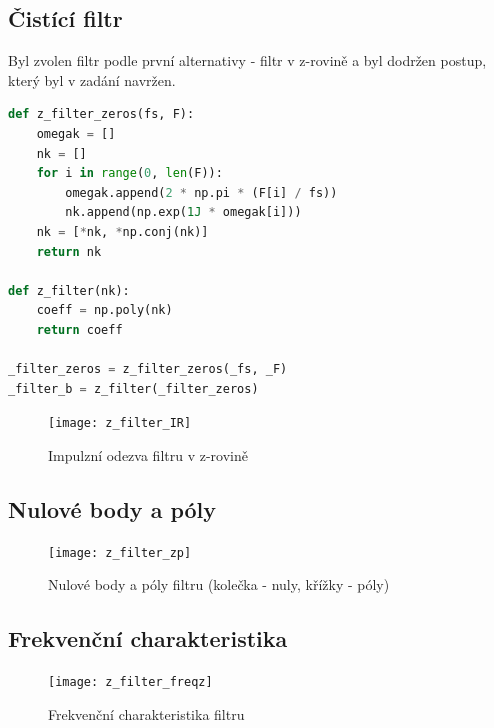 \documentclass{article}
\begin{document}
\newpage


\subsection{Čistící filtr}
\begin{flushleft}
    Byl zvolen filtr podle první alternativy - filtr v z-rovině a byl dodržen postup,
    který byl v zadání navržen.
\begin{lstlisting}[language=Python, caption={Výroba filtru v z-rovině}]
def z_filter_zeros(fs, F):
    omegak = []
    nk = []
    for i in range(0, len(F)):
        omegak.append(2 * np.pi * (F[i] / fs))
        nk.append(np.exp(1J * omegak[i]))
    nk = [*nk, *np.conj(nk)]
    return nk

def z_filter(nk):
    coeff = np.poly(nk)
    return coeff

_filter_zeros = z_filter_zeros(_fs, _F)
_filter_b = z_filter(_filter_zeros)
\end{lstlisting}

    \begin{figure}[ht]
        \centering
        \texttt{[image: z\_filter\_IR]}
        \caption{Impulzní odezva filtru v z-rovině}
    \end{figure}

\end{flushleft}

\newpage


\subsection{Nulové body a póly}
\begin{flushleft}
    \begin{figure}[ht]
        \centering
        \texttt{[image: z\_filter\_zp]}
        \caption{Nulové body a póly filtru (kolečka - nuly, křížky - póly)}
    \end{figure}
\end{flushleft}

\subsection{Frekvenční charakteristika}
\begin{flushleft}
    \begin{figure}[ht]
        \centering
        \texttt{[image: z\_filter\_freqz]}
        \caption{Frekvenční charakteristika filtru}
    \end{figure}
\end{flushleft}
\end{document}
